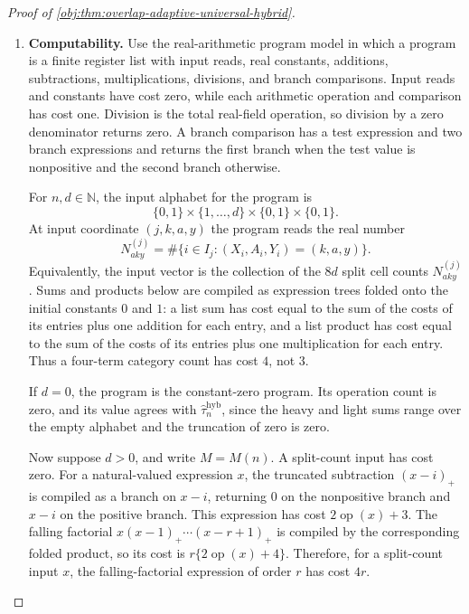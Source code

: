 \begin{proof}[Proof of \cref{obj:thm:overlap-adaptive-universal-hybrid}]
\begin{enumerate}
\item \textbf{Computability.}
Use the real-arithmetic program model in which a program is a finite register list with input reads, real constants, additions, subtractions, multiplications, divisions, and branch comparisons.  Input reads and constants have cost zero, while each arithmetic operation and comparison has cost one.  Division is the total real-field operation, so division by a zero denominator returns zero.  A branch comparison has a test expression and two branch expressions and returns the first branch when the test value is nonpositive and the second branch otherwise.

For \(n,d\in\mathbb N\), the input alphabet for the program is
\[
\{0,1\}\times\{1,\ldots,d\}\times\{0,1\}\times\{0,1\}.
\]
At input coordinate \((j,k,a,y)\) the program reads the real number
\[
N^{(j)}_{aky}
=
\#\{i\in I_j:(X_i,A_i,Y_i)=(k,a,y)\}.
\]
Equivalently, the input vector is the collection of the \(8d\) split cell counts \(N^{(j)}_{aky}\).  Sums and products below are compiled as expression trees folded onto the initial constants \(0\) and \(1\): a list sum has cost equal to the sum of the costs of its entries plus one addition for each entry, and a list product has cost equal to the sum of the costs of its entries plus one multiplication for each entry.  Thus a four-term category count has cost \(4\), not \(3\).

If \(d=0\), the program is the constant-zero program.  Its operation count is zero, and its value agrees with \(\widehat\tau_n^{\mathrm{hyb}}\), since the heavy and light sums range over the empty alphabet and the truncation of zero is zero.

Now suppose \(d>0\), and write \(M=M(n)\).  A split-count input has cost zero.  For a natural-valued expression \(x\), the truncated subtraction \((x-i)_+\) is compiled as a branch on \(x-i\), returning \(0\) on the nonpositive branch and \(x-i\) on the positive branch.  This expression has cost \(2\operatorname{op}(x)+3\).  The falling factorial \(x(x-1)_+\cdots(x-r+1)_+\) is compiled by the corresponding folded product, so its cost is \(r\{2\operatorname{op}(x)+4\}\).  Therefore, for a split-count input \(x\), the falling-factorial expression of order \(r\) has cost \(4r\).


\end{enumerate}
\end{proof}
